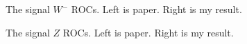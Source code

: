 \documentclass[12pt]{article}
\begin{document}
		\begin{figure}[htpb]
			\centering
			\caption{The signal $W^{-}$ ROCs. Left is paper. Right is my result.}
			\label{fig:ROCs_wm}
		\end{figure}
		\begin{figure}[htpb]
			\centering
			\caption{The signal $Z$ ROCs. Left is paper. Right is my result.}
			\label{fig:ROCs_z}
		\end{figure}
\end{document}
